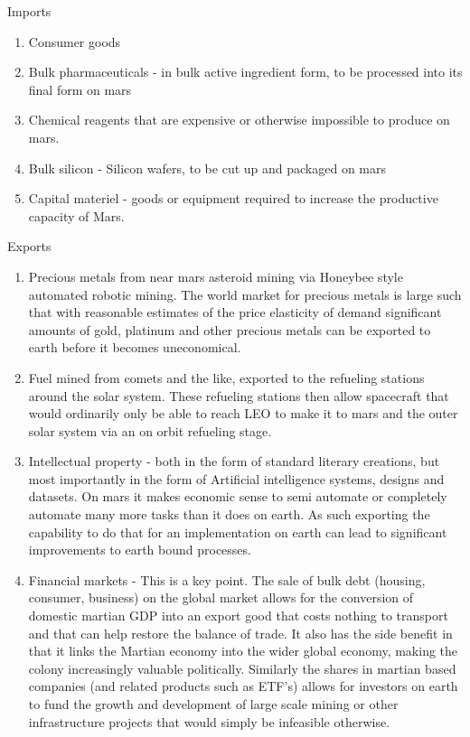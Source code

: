 \documentclass[10pt]{article}
\begin{document}
Imports
\begin{enumerate}
    \item Consumer goods
    \item Bulk pharmaceuticals - in bulk active ingredient form, to be processed into its final form on mars
    \item Chemical reagents that are expensive or otherwise impossible to produce on mars.
    \item Bulk silicon - Silicon wafers, to be cut up and packaged on mars
    \item Capital materiel  - goods or equipment required to increase the productive capacity of Mars.
\end{enumerate}

Exports
\begin{enumerate}
    \item Precious metals from near mars asteroid mining via Honeybee style automated robotic mining. The world market for precious metals is large such that with reasonable estimates of the price elasticity of demand significant amounts of gold, platinum and other precious metals can be exported to earth before it becomes uneconomical.
    \item Fuel mined from comets and the like, exported to the refueling stations around the solar system. These refueling stations then allow spacecraft that would ordinarily only be able to reach LEO to make it to mars and the outer solar system via an on orbit refueling stage.
    \item Intellectual property - both in the form of standard literary creations, but most importantly in the form of Artificial intelligence systems, designs and datasets. On mars it makes economic sense to semi automate or completely automate many more tasks than it does on earth. As such exporting the capability to do that for an implementation on earth can lead to significant improvements to earth bound processes.
    \item Financial markets - This is a key point. The sale of bulk debt (housing, consumer, business) on the global market allows for the conversion of domestic martian GDP into an export good that costs nothing to transport and that can help restore the balance of trade. It also has the side benefit in that it links the Martian economy into the wider global economy, making the colony increasingly valuable politically. Similarly the shares in martian based companies (and related products such as ETF's) allows for investors on earth to fund the growth and development of large scale mining or other infrastructure projects that would simply be infeasible otherwise. 

\end{enumerate}
\end{document}
